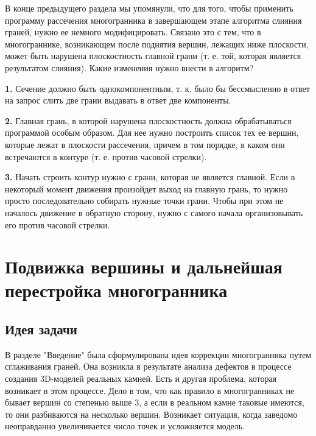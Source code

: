 \documentclass[a4paper,12pt, titlepage]{article}
\begin{document}
\begin{flushleft}
 В конце предыдущего раздела мы упомянули, что для того, чтобы применить программу рассечения многогранника в 
завершающем этапе алгоритма слияния граней, нужно ее немного модифицировать. Связано это с тем, что 
в многограннике, возникающем после поднятия вершин, лежащих ниже плоскости, может быть нарушена плоскостность
главной грани (т. е. той, которая является результатом слияния). Какие изменения нужно внести в алгоритм?
\end{flushleft}

\begin{flushleft}
 \textbf{1.} Сечение должно быть однокомпонентным, т. к. было бы бессмысленно в ответ на запрос слить две грани
выдавать в ответ две компоненты.
\end{flushleft}

\begin{flushleft}
 \textbf{2.} Главная грань, в которой нарушена плоскостность должна обрабатываться программой особым образом.
Для нее нужно построить список тех ее вершин, которые лежат в плоскости рассечения, причем в том порядке, в 
каком они встречаются в контуре (т. е. против часовой стрелки).
\end{flushleft}

\begin{flushleft}
 \textbf{3.} Начать строить контур нужно с грани, которая не является главной. Если в некоторый момент движения
произойдет выход на главную грань, то нужно просто последовательно собирать нужные точки грани. Чтобы при
этом не началось движение в обратную сторону, нужно с самого начала организовывать его против часовой стрелки.
\end{flushleft}




\newpage
\section{Подвижка вершины и дальнейшая перестройка многогранника}
\subsection{Идея задачи}
\begin{flushleft}
 В разделе "Введение" была сформулирована идея коррекции многогранника путем сглаживания граней. Она
возникла в результате анализа дефектов в процессе создания 3D-моделей реальных камней. Есть и другая
проблема, которая возникает в этом процессе. Дело в том, что как правило в многогранниках не бывает вершин
со степенью выше 3, а если в реальном камне таковые имеются, то они разбиваются на несколько вершин. 
Возникает ситуация, когда заведомо неоправданно увеличивается число точек и усложняется модель.
\end{flushleft}
\end{document}
